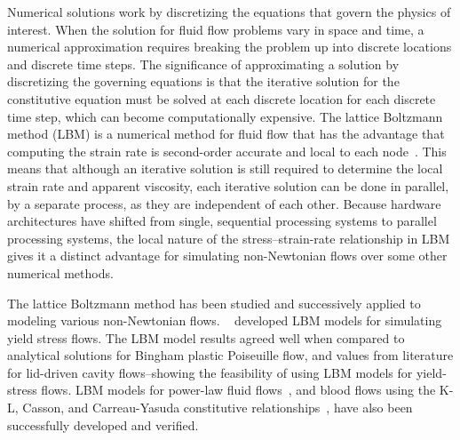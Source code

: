 \documentclass{article}
\begin{document}
Numerical solutions work by discretizing the equations that govern the physics of interest.
When the solution for fluid flow problems vary in space and time, a numerical approximation requires breaking the problem up into discrete locations and discrete time steps.
The significance of approximating a solution by discretizing the governing equations is that the iterative solution for the constitutive equation must be solved at each discrete location for each discrete time step, which can become computationally expensive.
The lattice Boltzmann method (LBM) is a numerical method for fluid flow that has the advantage that computing the strain rate is second-order accurate and local to each node~\cite{kruger2010second}.
This means that although an iterative solution is still required to determine the local strain rate and apparent viscosity, each iterative solution can be done in parallel, by a separate process, as they are independent of each other.
Because hardware architectures have shifted from single, sequential processing systems to parallel processing systems, the local nature of the stress--strain-rate relationship in LBM gives it a distinct advantage for simulating non-Newtonian flows over some other numerical methods.

The lattice Boltzmann method has been studied and successively applied to modeling various non-Newtonian flows.
~\citet{tang2011bingham,chai2011multiple,fallah2012multiple,chen2014simulations,vikhansky2008lattice,wang2008lattice} developed LBM models for simulating yield stress flows.
The LBM model results agreed well when compared to analytical solutions for Bingham plastic Poiseuille flow, and values from literature for lid-driven cavity flows--showing the feasibility of using LBM models for yield-stress flows.
LBM models for power-law fluid flows~\cite{wang2011lattice,wang2015localized,boyd2006second,chai2011multiple}, and blood flows using the K-L, Casson, and Carreau-Yasuda constitutive relationships~\cite{ashrafizaadeh2009comparison}, have also been successfully developed and verified. %
\end{document}
